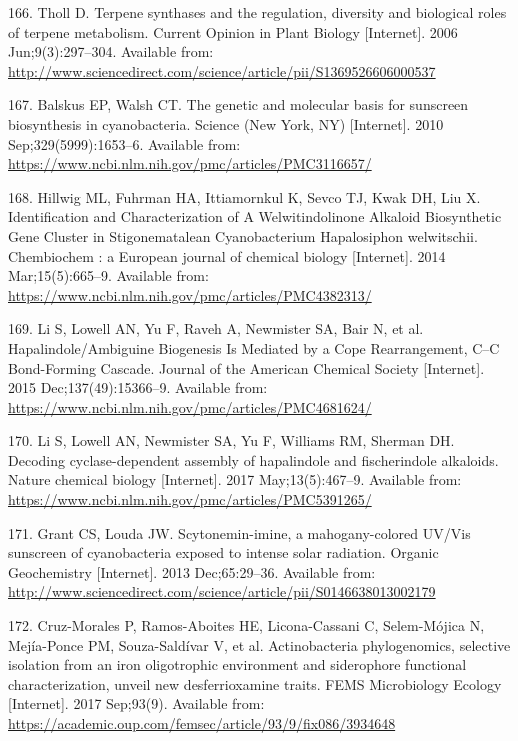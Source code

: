 \documentclass[12pt,twoside]{reedthesis}
\begin{document}
  \hypertarget{ref-tholl_terpene_2006}{}
  166. Tholl D. Terpene synthases and the regulation, diversity and
  biological roles of terpene metabolism. Current Opinion in Plant Biology
  {[}Internet{]}. 2006 Jun;9(3):297--304. Available from:
  \url{http://www.sciencedirect.com/science/article/pii/S1369526606000537}
  
  \hypertarget{ref-balskus_genetic_2010}{}
  167. Balskus EP, Walsh CT. The genetic and molecular basis for sunscreen
  biosynthesis in cyanobacteria. Science (New York, NY) {[}Internet{]}.
  2010 Sep;329(5999):1653--6. Available from:
  \url{https://www.ncbi.nlm.nih.gov/pmc/articles/PMC3116657/}
  
  \hypertarget{ref-hillwig_identification_2014}{}
  168. Hillwig ML, Fuhrman HA, Ittiamornkul K, Sevco TJ, Kwak DH, Liu X.
  Identification and Characterization of A Welwitindolinone Alkaloid
  Biosynthetic Gene Cluster in Stigonematalean Cyanobacterium Hapalosiphon
  welwitschii. Chembiochem : a European journal of chemical biology
  {[}Internet{]}. 2014 Mar;15(5):665--9. Available from:
  \url{https://www.ncbi.nlm.nih.gov/pmc/articles/PMC4382313/}
  
  \hypertarget{ref-li_hapalindole_ambiguine_2015}{}
  169. Li S, Lowell AN, Yu F, Raveh A, Newmister SA, Bair N, et al.
  Hapalindole/Ambiguine Biogenesis Is Mediated by a Cope Rearrangement,
  C--C Bond-Forming Cascade. Journal of the American Chemical Society
  {[}Internet{]}. 2015 Dec;137(49):15366--9. Available from:
  \url{https://www.ncbi.nlm.nih.gov/pmc/articles/PMC4681624/}
  
  \hypertarget{ref-li_decoding_2017}{}
  170. Li S, Lowell AN, Newmister SA, Yu F, Williams RM, Sherman DH.
  Decoding cyclase-dependent assembly of hapalindole and fischerindole
  alkaloids. Nature chemical biology {[}Internet{]}. 2017
  May;13(5):467--9. Available from:
  \url{https://www.ncbi.nlm.nih.gov/pmc/articles/PMC5391265/}
  
  \hypertarget{ref-grant_scytonemin-imine_2013}{}
  171. Grant CS, Louda JW. Scytonemin-imine, a mahogany-colored UV/Vis
  sunscreen of cyanobacteria exposed to intense solar radiation. Organic
  Geochemistry {[}Internet{]}. 2013 Dec;65:29--36. Available from:
  \url{http://www.sciencedirect.com/science/article/pii/S0146638013002179}
  
  \hypertarget{ref-cruz-morales_actinobacteria_2017}{}
  172. Cruz-Morales P, Ramos-Aboites HE, Licona-Cassani C, Selem-Mójica N,
  Mejía-Ponce PM, Souza-Saldívar V, et al. Actinobacteria phylogenomics,
  selective isolation from an iron oligotrophic environment and
  siderophore functional characterization, unveil new desferrioxamine
  traits. FEMS Microbiology Ecology {[}Internet{]}. 2017 Sep;93(9).
  Available from:
  \url{https://academic.oup.com/femsec/article/93/9/fix086/3934648}
  
\end{document}

